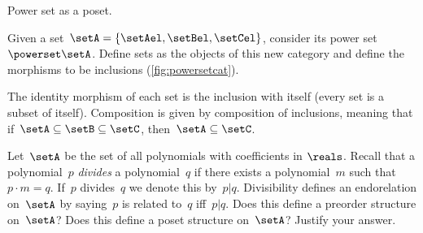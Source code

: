 \begin{marginfigure}
    \centering
    \caption{Power set as a poset.}
    \label{fig:powersetcat}
\end{marginfigure}

\begin{example}
    \label{ex:hasseinclusion}
    Given a set~$\setA=\{\setAel,\setBel,\setCel\}$, consider its power set~$\powerset\setA$.
    Define sets as the objects of this new category and define the morphisms to be inclusions (\cref{fig:powersetcat}).

    The identity morphism of each set is the inclusion with itself (every set is a subset of itself).
    Composition is given by composition of inclusions, meaning that if~$\setA\subseteq \setB \subseteq \setC$, then~$\setA\subseteq \setC$.
\end{example}

\vfill
%

\begin{gradedexercise}
    \label{ex:PolynomialDivisibility}
    Let~$\setA$ be the set of all polynomials with coefficients in $\reals$.
    Recall that a polynomial~$p$ \emph{divides} a polynomial~$q$ if there exists a polynomial~$m$ such that~$p \cdot m = q$.
    If~$p$ divides~$q$ we denote this by~$p \vert q$.
    Divisibility defines an endorelation on~$\setA$ by saying~$p$ is related to~$q$ iff~$p \vert q$.
    Does this define a preorder structure on~$\setA$?
    Does this define a poset structure on~$\setA$?
    Justify your answer.
\end{gradedexercise}



